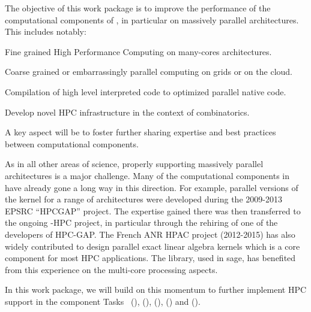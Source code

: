 \begin{workpackage}[id=hpc,wphases=0-48,
  short=High Performance Math. Computing,%
  title=High Performance Mathematical Computing,
  lead=UJF,
  USHRM=12, %
  PSRM=6,   %
  LLRM=12,  %
  SARM=18, %
  UKRM=94, %
  UBRM=40,  %
  UJFRM=52] %
  

\begin{wpobjectives}
  The objective of this work package is to improve the performance of
  the computational components of \TheProject, in particular on
  massively parallel architectures. This includes notably:
  \begin{compactitem}
  \item Fine grained High Performance Computing on many-cores architectures.
  \item Coarse grained or embarrassingly parallel computing on grids or on the cloud.
  \item Compilation of high level interpreted code to optimized parallel native code.
  \item Develop novel HPC infrastructure in the context of combinatorics.
  \end{compactitem}
  A key aspect will be to foster further sharing expertise and best
  practices between computational components.
\end{wpobjectives}

\begin{wpdescription}
  As in all other areas of science, properly supporting massively
  parallel architectures is a major challenge. Many of the
  computational components in \TheProject have already gone a long way
  in this direction. For example, parallel versions
  of the \GAP kernel for
  a range of architectures were developed during the 2009-2013 EPSRC
  ``HPCGAP'' project. The expertise
  gained there was then transferred to the ongoing \Singular-HPC
  project, in particular through the rehiring of one of the developers
  of HPC-GAP. The French ANR HPAC project (2012-2015) has also widely contributed to design
  parallel exact linear algebra kernels  which is a core component for most HPC
  applications. The \Linbox library, used in sage, has benefited from this
  experience on the multi-core processing aspects. 

  In this work package, we will build on this momentum to further implement HPC support in
  the component Tasks~ (\Pari), (\GAP),
   (\Linbox), (\MPIR) and
   (\Singular).
  

\end{wpdescription}
\end{workpackage}
